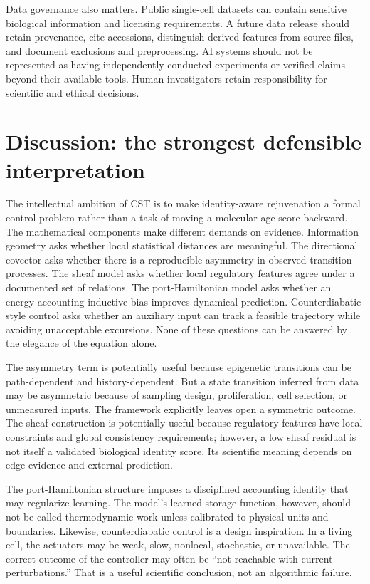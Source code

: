 \documentclass[11pt,a4paper]{article}
\theoremstyle{definition}
\theoremstyle{remark}
\begin{document}
Data governance also matters. Public single-cell datasets can contain sensitive biological information and licensing requirements. A future data release should retain provenance, cite accessions, distinguish derived features from source files, and document exclusions and preprocessing. AI systems should not be represented as having independently conducted experiments or verified claims beyond their available tools. Human investigators retain responsibility for scientific and ethical decisions.

\section{Discussion: the strongest defensible interpretation}
The intellectual ambition of CST is to make identity-aware rejuvenation a formal control problem rather than a task of moving a molecular age score backward. The mathematical components make different demands on evidence. Information geometry asks whether local statistical distances are meaningful. The directional covector asks whether there is a reproducible asymmetry in observed transition processes. The sheaf model asks whether local regulatory features agree under a documented set of relations. The port-Hamiltonian model asks whether an energy-accounting inductive bias improves dynamical prediction. Counterdiabatic-style control asks whether an auxiliary input can track a feasible trajectory while avoiding unacceptable excursions. None of these questions can be answered by the elegance of the equation alone.

The asymmetry term is potentially useful because epigenetic transitions can be path-dependent and history-dependent. But a state transition inferred from data may be asymmetric because of sampling design, proliferation, cell selection, or unmeasured inputs. The framework explicitly leaves open a symmetric outcome. The sheaf construction is potentially useful because regulatory features have local constraints and global consistency requirements; however, a low sheaf residual is not itself a validated biological identity score. Its scientific meaning depends on edge evidence and external prediction.

The port-Hamiltonian structure imposes a disciplined accounting identity that may regularize learning. The model's learned storage function, however, should not be called thermodynamic work unless calibrated to physical units and boundaries. Likewise, counterdiabatic control is a design inspiration. In a living cell, the actuators may be weak, slow, nonlocal, stochastic, or unavailable. The correct outcome of the controller may often be ``not reachable with current perturbations.'' That is a useful scientific conclusion, not an algorithmic failure.
\end{document}
